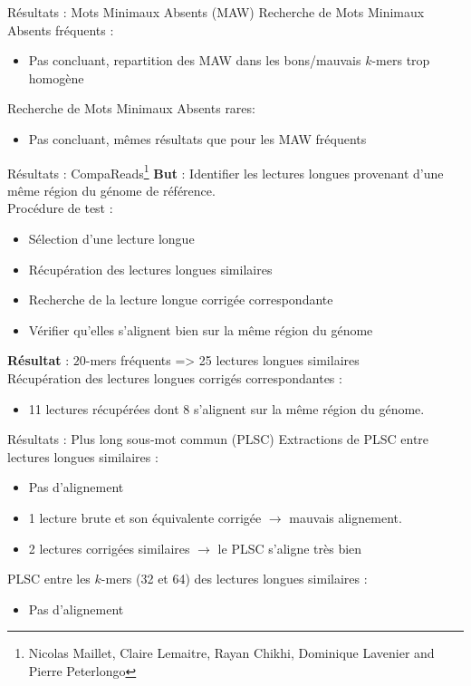 \documentclass[11pt]{beamer}
\begin{document}
\begin{frame}[fragile]{Résultats : Mots Minimaux Absents (MAW)}
  Recherche de Mots Minimaux Absents fréquents :\pause
  \begin{itemize}
    \item Pas concluant, repartition des MAW dans les bons/mauvais $k$-mers trop homogène
  \end{itemize}\pause
  Recherche de Mots Minimaux Absents rares:\pause
  \begin{itemize}
    \item Pas concluant, mêmes résultats que pour les MAW fréquents
  \end{itemize}
\end{frame}

\begin{frame}[fragile]{Résultats : CompaReads\footnote{Nicolas Maillet, Claire Lemaitre, Rayan Chikhi, Dominique Lavenier and Pierre Peterlongo\cite{CompaReads2012}}}
  \textbf{But} : Identifier les lectures longues provenant d'une même région du génome de référence.\medskip\pause\\
  Procédure de test :\pause
  \begin{itemize}[<+-| alert@+>]
    \item Sélection d'une lecture longue
    \item Récupération des lectures longues similaires
    \item Recherche de la lecture longue corrigée correspondante
    \item Vérifier qu'elles s'alignent bien sur la même région du génome
  \end{itemize}\pause
  \textbf{Résultat} : $20$-mers fréquents => 25 lectures longues similaires\medskip\pause\\
  Récupération des lectures longues corrigés correspondantes :\\
  \begin{itemize}
    \item 11 lectures récupérées dont 8 s'alignent sur la même région du génome.
  \end{itemize}\bigskip
\end{frame}

\begin{frame}[fragile]{Résultats : Plus long sous-mot commun (PLSC)}
  Extractions de PLSC entre lectures longues similaires :\pause
  \begin{itemize}[<+-| alert@+>]
    \item Pas d'alignement
    \item 1 lecture brute et son équivalente corrigée $\rightarrow$ mauvais alignement.
    \item 2 lectures corrigées similaires $\rightarrow$ le PLSC s'aligne très bien
  \end{itemize}\pause
  PLSC entre les $k$-mers (32 et 64) des lectures longues similaires :\\
  \begin{itemize}
    \item Pas d'alignement
  \end{itemize}
\end{frame}
\end{document}
